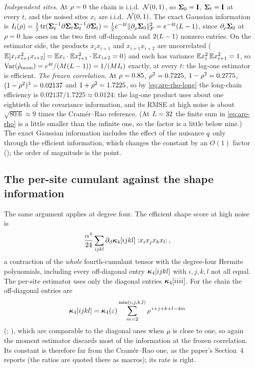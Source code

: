 \begin{example}
\label{ex:are}
\emph{Independent sites.} At $\rho=0$ the chain is i.i.d.\ $\mathcal{N}\!\left(0,1\right)$, so
$\mathbf{\Sigma}_0=\mathbf{I}$, $\mathbf{\Sigma}_t=\mathbf{I}$ at every $t$, and the noised sites $x_i$ are i.i.d.\
$\mathcal{N}\!\left(0,1\right)$. The exact Gaussian information is
$I_t(\rho)=\tfrac12\operatorname{tr}(\mathbf{\Sigma}_t^{-1}\partial\mathbf{\Sigma}_t\mathbf{\Sigma}_t^{-1}\partial\mathbf{\Sigma}_t)=\tfrac12e^{-4t}\lVert \partial_\rho\mathbf{\Sigma}_0 \rVert_{F}^2=e^{-4t}(L-1)$,
since $\partial_\rho\mathbf{\Sigma}_0$ at $\rho=0$ has ones on the two first off-diagonals and
$2(L-1)$ nonzero entries. On the estimator side, the products $x_ix_{i+1}$ and
$x_{i+1}x_{i+2}$ are uncorrelated ($\mathbb{E}[x_ix_{i+1}^2x_{i+2}]=\mathbb{E} x_i\cdot\mathbb{E} x_{i+1}^2\cdot\mathbb{E} x_{i+2}=0$)
and each has variance $\mathbb{E} x_i^2\,\mathbb{E} x_{i+1}^2=1$, so
$\operatorname{Var}(\hat{\rho}_{\mathrm{mom}})=e^{4t}/(M(L-1))=1/(M I_t)$ exactly, at every
$t$: the lag-one estimator is efficient. \emph{The frozen correlation.} At $\rho=0.85$,
$\rho^2=0.7225$, $1-\rho^2=0.2775$, $(1-\rho^2)^3=0.02137$ and
$1+\rho^2=1.7225$, so by \cref{eq:are-rho-long} the long-chain efficiency is
$0.02137/1.7225\approx0.0124$: the lag-one product uses about one eightieth of the
covariance information, and its RMSE at high noise is about $\sqrt{80.6}\approx9$ times
the Cram\'er--Rao reference. (At $L=32$ the finite sum in \cref{eq:are-rho} is a
little smaller than the infinite one, so the factor is a little below nine.) The exact
Gaussian information includes the effect of the nuisance $q$ only through the
efficient information, which changes the constant by an $O(1)$ factor
(\Cref{ch:attenuation-theorems}); the order of magnitude is the point.
\end{example}

\subsection{The per-site cumulant against the shape information}

The same argument applies at degree four. The efficient shape score at high noise is
\begin{equation}
  \frac{\alpha^4}{24}\sum_{ijkl}\partial_\beta\bm{\kappa}_4[ijkl]\;{:}x_ix_jx_kx_l{:}\,,
\end{equation}
a contraction of the \emph{whole} fourth-cumulant tensor with the degree-four Hermite polynomials,
including every off-diagonal entry $\bm{\kappa}_4[ijkl]$ with $i,j,k,l$ not all equal. The
per-site estimator uses only the diagonal entries $\bm{\kappa}_4[iiii]$. For the chain the
off-diagonal entries are
\begin{equation}
  \bm{\kappa}_4[ijkl]=\bm{\kappa}_4(\varepsilon)\sum_{m=2}^{\min(i,j,k,l)}\rho^{\,i+j+k+l-4m}
\end{equation}
(; ), which are comparable to the
diagonal ones when $\rho$ is close to one, so again the moment estimator discards most
of the information at the frozen correlation. Its constant is therefore far from the
Cram\'er--Rao one, as the paper's Section~4 reports (the ratios are quoted there as
macros); its rate is right.

